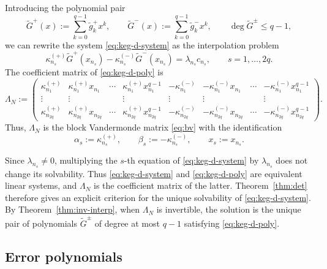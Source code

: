 \documentclass[11pt,a4paper]{article}
\theoremstyle{definition}
\begin{document}
Introducing the polynomial pair
\[
\widetilde G^+(x)
:=
\sum_{k=0}^{q-1}\widetilde g_k^+x^k,
\qquad
\widetilde G^-(x)
:=
\sum_{k=0}^{q-1}\widetilde g_k^-x^k,
\qquad
\deg\widetilde G^\pm\leq q-1,
\]
we can rewrite the system \eqref{eq:keg-d-system} as the interpolation
problem
\begin{equation}\label{eq:keg-d-poly}
\kappa_{n_s}^{(+)}\widetilde G^+(x_{n_s})
-
\kappa_{n_s}^{(-)}\widetilde G^-(x_{n_s})
=
\lambda_{n_s}c_{n_s},
\qquad
s=1,\dots,2q.
\end{equation}
The coefficient matrix of \eqref{eq:keg-d-poly} is
\begin{equation}\label{eq:keg-d-matrix}
\Lambda_N
:=
\begin{pmatrix}
\kappa_{n_1}^{(+)}
&
\kappa_{n_1}^{(+)}x_{n_1}
&
\cdots
&
\kappa_{n_1}^{(+)}x_{n_1}^{q-1}
&
-\kappa_{n_1}^{(-)}
&
-\kappa_{n_1}^{(-)}x_{n_1}
&
\cdots
&
-\kappa_{n_1}^{(-)}x_{n_1}^{q-1}
\\
\vdots & \vdots & & \vdots
&
\vdots & \vdots & & \vdots
\\
\kappa_{n_{2q}}^{(+)}
&
\kappa_{n_{2q}}^{(+)}x_{n_{2q}}
&
\cdots
&
\kappa_{n_{2q}}^{(+)}x_{n_{2q}}^{q-1}
&
-\kappa_{n_{2q}}^{(-)}
&
-\kappa_{n_{2q}}^{(-)}x_{n_{2q}}
&
\cdots
&
-\kappa_{n_{2q}}^{(-)}x_{n_{2q}}^{q-1}
\end{pmatrix}.
\end{equation}
Thus, $\Lambda_N$ is the block Vandermonde matrix
\eqref{eq:bv} with the identification
\begin{equation}\label{eq:identification}
\alpha_s:=\kappa_{n_s}^{(+)},
\qquad
\beta_s:=-\kappa_{n_s}^{(-)},
\qquad
x_s:=x_{n_s}.
\end{equation}

Since $\lambda_{n_s}\neq0$, multiplying the $s$-th equation of
\eqref{eq:keg-d-system} by $\lambda_{n_s}$ does not change its
solvability. Thus \eqref{eq:keg-d-system} and
\eqref{eq:keg-d-poly} are equivalent linear systems, and
$\Lambda_N$ is the coefficient matrix of the latter.
Theorem~\ref{thm:det} therefore gives an explicit criterion for the
unique solvability of \eqref{eq:keg-d-system}. By
Theorem~\ref{thm:inv-interp}, when $\Lambda_N$ is invertible, the
solution is the unique pair of polynomials $\widetilde G^\pm$ of
degree at most $q-1$ satisfying \eqref{eq:keg-d-poly}.

\subsection{Error polynomials}\label{ssec:err}
\end{document}
